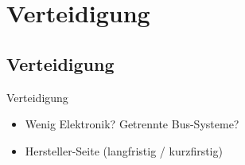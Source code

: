 \section{Verteidigung}

\subsection{Verteidigung}

\begin{frame}{Verteidigung}
    \begin{itemize}
        \item Wenig Elektronik? Getrennte Bus-Systeme?
        \item Hersteller-Seite (langfristig / kurzfirstig)
    \end{itemize}
\end{frame}